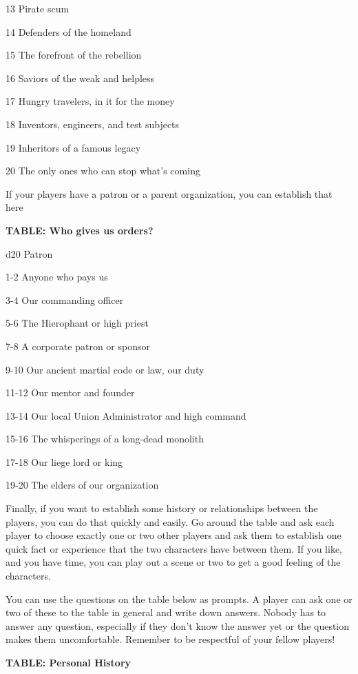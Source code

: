   13       Pirate scum

  14       Defenders of the homeland

  15       The forefront of the rebellion

  16       Saviors of the weak and helpless

  17       Hungry travelers, in it for the money

  18       Inventors, engineers, and test subjects

  19       Inheritors of a famous legacy

  20       The only ones who can stop what’s coming

If your players have a patron or a parent organization, you can establish that here

\textbf{TABLE: Who gives us orders?}

 d20       Patron

 1-2       Anyone who pays us

 3-4       Our commanding officer

 5-6       The Hierophant or high priest

 7-8       A corporate patron or sponsor

 9-10      Our ancient martial code or law, our duty

 11-12     Our mentor and founder

 13-14     Our local Union Administrator and high command

 15-16     The whisperings of a long-dead monolith

 17-18     Our liege lord or king

 19-20     The elders of our organization

Finally, if you want to establish some history or relationships between the players, you can do
that quickly and easily. Go around the table and ask each player to choose exactly one or two
other players and ask them to establish one quick fact or experience that the two characters
have between them. If you like, and you have time, you can play out a scene or two to get a
good feeling of the characters.

You can use the questions on the table below as prompts. A player can ask one or two of these
to the table in general and write down answers. Nobody has to answer any question, especially if
they don’t know the answer yet or the question makes them uncomfortable. Remember to be
respectful of your fellow players!

\textbf{TABLE: Personal History}

